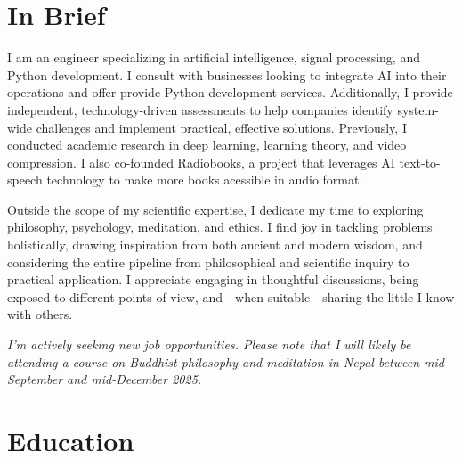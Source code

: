 \documentclass[a4paper,11pt]{article}
\newcommand{\sectionBioNonTech}{
      Outside the scope of my scientific expertise, I dedicate my time to exploring philosophy, psychology, meditation, and ethics. I find joy in tackling problems holistically, drawing inspiration from both ancient and modern wisdom, and considering the entire pipeline from philosophical and scientific inquiry to practical application. I appreciate engaging in thoughtful discussions, being exposed to different points of view, and—when suitable—sharing the little I know with others.

    }
\newcommand{\sectionBioNonTech}{
      \vspace{10pt}
      Highlights: \\[-20pt]
      \begin{itemize}[topsep=0pt, partopsep=0pt, parsep=0pt, itemsep=0pt, leftmargin=*]
        \item Published \href{https://www.joaquimcampos.com/pubs.html}{seven papers} with over 400 citations in top-tier venues, and holds three patents.
        \item Contributed to the development of \href{https://www.joaquimcampos.com/compression.html}{pioneering methods} in neural compression.
        \item Designed \href{https://www.joaquimcampos.com/deepsplines.html}{novel algorithms} for
        learning the activation functions of a neural network.
        \item Created the \href{https://pypi.org/project/deepsplines/}{"Deep Splines"} PyTorch package.
        \item Co-Founded \href{https://radiobooks.webflow.io/}{Radiobooks}—a startup powered by AI text-to-speech technology.
        \item Built the \href{https://github.com/joaquimcampos/radiobooks-sample}{back-end} of a complex text-to-speech app.
      \end{itemize}
    }
\begin{document}

  \vspace{15pt}

  \section{In Brief}
    I am an engineer specializing in artificial intelligence, signal processing, and Python development. I consult with businesses looking to integrate AI into their operations and offer provide Python development services. Additionally, I provide independent, technology-driven assessments to help companies identify system-wide challenges and implement practical, effective solutions. Previously, I conducted academic research in deep learning, learning theory, and video compression. I also co-founded Radiobooks, a project that leverages AI text-to-speech technology to make more books acessible in audio format.


    \sectionBioNonTech

    \vspace{4pt}

    \emph{I'm actively seeking new job opportunities. Please note that I will likely be attending a course on Buddhist philosophy and meditation in Nepal between mid-September and mid-December 2025.}

  \vspace{15pt}

  \section{Education}
\end{document}
